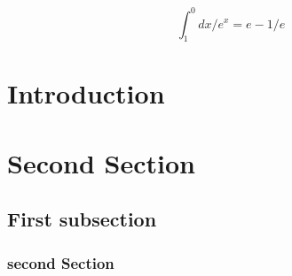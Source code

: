 \documentclass[a4paper,10pt]{article}
\begin{document}
\begin{equation}
    \int^{0}_{1} dx/e^x = e-1/e
\end{equation}


\section[short]{ Introduction}
\section[short]{ Second Section}
\subsection[short]{ First subsection}
\subsubsection[short]{second Section}
\end{document}
